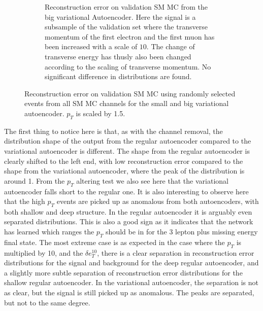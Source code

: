 \begin{figure}[h!]
\begin{subfigure}{.45\textwidth}
        \caption{Reconstruction error on validation SM MC from the big variational Autoencoder. Here the signal is a subsample of the validation 
        set where the transverse momentum of the first electron and the first muon has been increased with a scale of $10$. The change of transverse 
        energy has thusly also been changed according to the scaling of transverse momentum. No significant difference in distributions are found. }
        \label{fig:VAE_big_pt_10}
    \end{subfigure}
    \hfill 
    \caption[VAE | Reconstruction error $p_T$ altering of 10]{Reconstruction error on validation SM MC using randomly selected events from all SM 
    MC channels for the small and big variational autoencoder. $p_T$ is scaled by 1.5. }
    \label{fig:VAE_big_small_pt_10}
\end{figure}

The first thing to notice here is that, as with the channel removal, the distribution shape of the output from the regular autoencoder compared to the
variational autoencoder is different. The shape from the regular autoencoder is clearly shifted to the left end, with low reconstruction error compared 
to the shape from the variational autoencoder, where the peak of the distribution is around 1. From the $p_T$ altering test we also see here that the 
variational autoencoder falls short to the regular one. It is also interesting to observe here that the high $p_T$ events are picked up as anomalous from both
autoencoders, with both shallow and deep structure. In the regular autoencoder it is arguably even separated distributions. This is also a good sign as it 
indicates that the network has learned which ranges the $p_T$ should be in for the 3 lepton plus missing energy final state. The most extreme case is 
as expected in the case where the $p_T$ is multiplied by 10, and the $\delta e_T^{10}$, there is a clear separation in reconstruction error distributions for the
signal and background for the deep regular autoencoder, and a slightly more subtle separation of reconstruction error distributions for the shallow regular autoencoder.
In the variational autoencoder, the separation is not as clear, but the signal is still picked up as anomalous. The peaks are separated, but not to the same degree. 

\newpage
